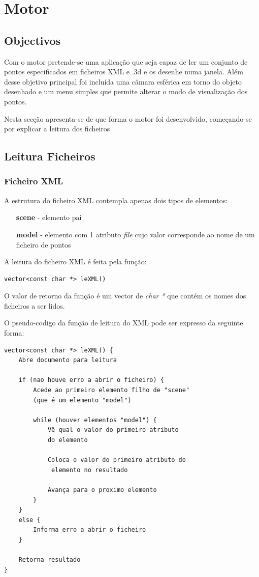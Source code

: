 \chapter{Motor}
\label{cap:p2}

\section{Objectivos}

Com o motor pretende-se uma aplicação que seja capaz de ler um conjunto de pontos especificados em ficheiros XML e .3d e os desenhe numa janela. Além desse objetivo principal foi incluída uma câmara esférica em torno do objeto desenhado e um menu simples que permite alterar o modo de visualização dos pontos.

Nesta secção apresenta-se de que forma o motor foi desenvolvido, começando-se por explicar a leitura dos ficheiros

\section{Leitura Ficheiros}

\subsection{Ficheiro XML}

A estrutura do ficheiro XML contempla apenas dois tipos de elementos:

\begin{itemize}
	\item[\textbf{scene}] - elemento pai
	\item[\textbf{model}] - elemento com 1 atributo \textit{file} cujo valor corresponde ao nome de um ficheiro de pontos
\end{itemize}

A leitura do ficheiro XML é feita pela função:

\begin{Verbatim}
vector<const char *> leXML()
\end{Verbatim}

O valor de retorno da função é um vector de \textit{char *} que contém os nomes dos ficheiros a ser lidos.

O pseudo-codigo da função de leitura do XML pode ser expresso da seguinte forma:

\begin{Verbatim}
vector<const char *> leXML() {
	Abre documento para leitura
	
	if (nao houve erro a abrir o ficheiro) {
		Acede ao primeiro elemento filho de "scene" 
		(que é um elemento "model")
		
		while (houver elementos "model") {
			Vê qual o valor do primeiro atributo 
			do elemento
			
			Coloca o valor do primeiro atributo do
			 elemento no resultado
			 
			Avança para o proximo elemento
		}
	}
	else {
		Informa erro a abrir o ficheiro
	}
	
	Retorna resultado
}
\end{Verbatim}

